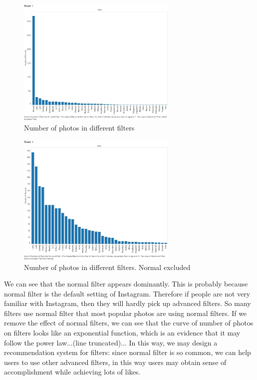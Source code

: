 \documentclass[conference]{acmsiggraph}
\begin{document}
\begin{figure}[ht]
  \centering
  \includegraphics[width=3in]{images/sample_all_number-filter_sorted}
  \caption{Number of photos in different filters}
  \label{normal}
\end{figure}
\begin{figure}[ht]
  \includegraphics[width=3in]{images/sample_all_number-filter_sorted_no-normal}
  \centering
  \caption{Number of photos in different filters. Normal excluded}
  \label{no-normal}
\end{figure}


We can see that the normal filter appears dominantly. This is probably because normal filter is the default setting of Instagram. Therefore if people are not very familiar with Instagram, then they will hardly pick up advanced filters. So many filters use normal filter that most popular photos are using normal filters. If we remove the effect of normal filters, we can see that the curve of  number of photos on filters looks like an exponential function, which is an evidence that it may  follow the power law...(line truncated)...
In this way, we may design a recommendation system for filters:
since normal filter is so common,
we can help users to use other advanced filters,
in this way users may obtain sense of accomplishment while achieving lots of likes.
\end{document}
